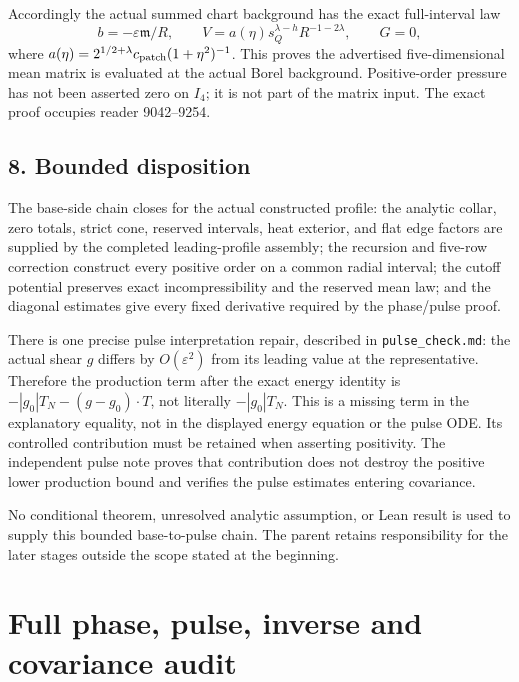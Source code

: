 \documentclass[10pt,a4paper]{article}
\begin{document}
Accordingly the actual summed chart background has the exact full-interval law \[
b=-\varepsilon\mathfrak m/R,
\qquad V=a(\eta)s_Q^{\lambda-h}R^{-1-2\lambda},
\qquad G=0,
\] where \(a(\eta)=2^{1/2+\lambda}c_{\rm patch}(1+\eta^2)^{-1}\). This proves the advertised five-dimensional mean matrix is evaluated at the actual Borel background. Positive-order pressure has not been asserted zero on \(I_4\); it is not part of the matrix input. The exact proof occupies reader 9042--9254.

\subsection{8. Bounded disposition}\label{gclosure:bounded-disposition}

The base-side chain closes for the actual constructed profile: the analytic collar, zero totals, strict cone, reserved intervals, heat exterior, and flat edge factors are supplied by the completed leading-profile assembly; the recursion and five-row correction construct every positive order on a common radial interval; the cutoff potential preserves exact incompressibility and the reserved mean law; and the diagonal estimates give every fixed derivative required by the phase/pulse proof.

There is one precise pulse interpretation repair, described in \texttt{pulse\_check.md}: the actual shear \(g\) differs by \(O(\varepsilon^2)\) from its leading value at the representative. Therefore the production term after the exact energy identity is \(-|g_0|T_N-(g-g_0)\cdot T\), not literally \(-|g_0|T_N\). This is a missing term in the explanatory equality, not in the displayed energy equation or the pulse ODE. Its controlled contribution must be retained when asserting positivity. The independent pulse note proves that contribution does not destroy the positive lower production bound and verifies the pulse estimates entering covariance.

No conditional theorem, unresolved analytic assumption, or Lean result is used to supply this bounded base-to-pulse chain. The parent retains responsibility for the later stages outside the scope stated at the beginning.

\section{Full phase, pulse, inverse and covariance audit}\label{gclosure:full-phase-pulse-inverse-and-covariance-audit}
\end{document}

